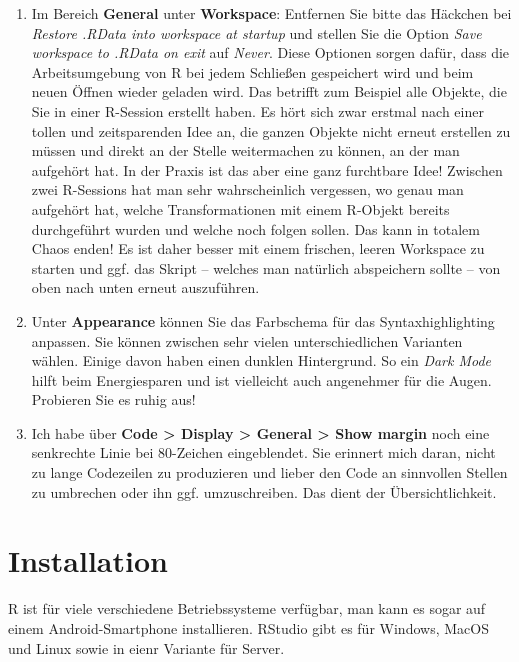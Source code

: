 \documentclass[
]{book}
\begin{document}
\begin{enumerate}
\def\labelenumi{\arabic{enumi}.}
\item
  Im Bereich \textbf{General} unter \textbf{Workspace}: Entfernen Sie bitte das Häckchen bei \emph{Restore .RData into workspace at startup} und stellen Sie die Option \emph{Save workspace to .RData on exit} auf \emph{Never}. Diese Optionen sorgen dafür, dass die Arbeitsumgebung von R bei jedem Schließen gespeichert wird und beim neuen Öffnen wieder geladen wird. Das betrifft zum Beispiel alle Objekte, die Sie in einer R-Session erstellt haben. Es hört sich zwar erstmal nach einer tollen und zeitsparenden Idee an, die ganzen Objekte nicht erneut erstellen zu müssen und direkt an der Stelle weitermachen zu können, an der man aufgehört hat. In der Praxis ist das aber eine ganz furchtbare Idee! Zwischen zwei R-Sessions hat man sehr wahrscheinlich vergessen, wo genau man aufgehört hat, welche Transformationen mit einem R-Objekt bereits durchgeführt wurden und welche noch folgen sollen. Das kann in totalem Chaos enden! Es ist daher besser mit einem frischen, leeren Workspace zu starten und ggf. das Skript -- welches man natürlich abspeichern sollte -- von oben nach unten erneut auszuführen.
\item
  Unter \textbf{Appearance} können Sie das Farbschema für das Syntaxhighlighting anpassen. Sie können zwischen sehr vielen unterschiedlichen Varianten wählen. Einige davon haben einen dunklen Hintergrund. So ein \emph{Dark Mode} hilft beim Energiesparen und ist vielleicht auch angenehmer für die Augen. Probieren Sie es ruhig aus!
\item
  Ich habe über \textbf{Code \textgreater{} Display \textgreater{} General \textgreater{} Show margin} noch eine senkrechte Linie bei 80-Zeichen eingeblendet. Sie erinnert mich daran, nicht zu lange Codezeilen zu produzieren und lieber den Code an sinnvollen Stellen zu umbrechen oder ihn ggf. umzuschreiben. Das dient der Übersichtlichkeit.
\end{enumerate}

\hypertarget{installation}{%
\chapter{Installation}\label{installation}}

R ist für viele verschiedene Betriebssysteme verfügbar, man kann es sogar auf einem Android-Smartphone installieren. RStudio gibt es für Windows, MacOS und Linux sowie in eienr Variante für Server.
\end{document}
